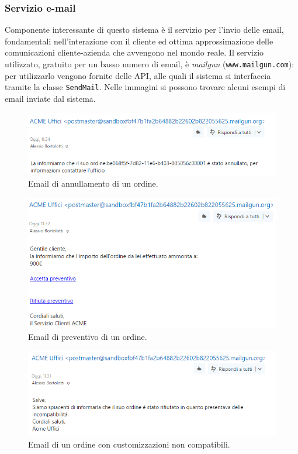 \subsubsection{Servizio e-mail}
Componente interessante di questo sistema \`e il servizio per l'invio
delle email, fondamentali nell'interazione con il cliente ed ottima
approssimazione delle comunicazioni cliente-azienda che avvengono nel
mondo reale.
Il servizio utilizzato, gratuito per un basso numero di email, \`e
\textit{mailgun} ({\tt www.mailgun.com}): per utilizzarlo vengono
fornite delle API, alle quali il sistema si interfaccia tramite la
classe {\tt SendMail}.
Nelle immagini si possono trovare alcuni esempi di email inviate dal
sistema.
\newpage
\begin{figure}
  \includegraphics[scale=0.7]{immagini/email_annullamento_ordine.PNG}
  \captionsetup{labelformat=empty}
  \caption{Email di annullamento di un ordine.}
\end{figure}
\begin{figure}
  \includegraphics[scale=0.7]{immagini/email_preventivo.PNG}
  \captionsetup{labelformat=empty}
  \caption{Email di preventivo di un ordine.}
\end{figure}
\begin{figure}
  \includegraphics[scale=0.7]{immagini/email_incompatibilita.PNG}
  \captionsetup{labelformat=empty}
  \caption{Email di un ordine con customizzazioni non compatibili.}
\end{figure}
\newpage
